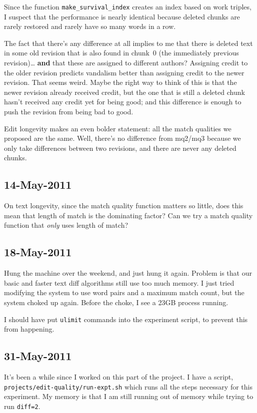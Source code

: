 Since the function \texttt{make\_survival\_index} creates
an index based on work triples, I suspect that the performance
is nearly identical because deleted chunks are rarely restored
and rarely have so many words in a row.

The fact that there's any difference at all implies to me
that there is deleted text in some old revision that is
also found in chunk~0 (the immediately previous revision)\ldots
\textbf{and} that these are assigned to different authors?
Assigning credit to the older revision predicts vandalism
better than assigning credit to the newer revision.
That seems weird.
Maybe the right way to think of this is that the newer revision
already received credit, but the one that is still a deleted
chunk hasn't received any credit yet for being good;
and this difference is enough to push the revision from
being bad to good.

Edit longevity makes an even bolder statement: all the
match qualities we proposed are the same.
Well, there's no difference from mq2/mq3 because we only
take differences between two revisions, and there are never
any deleted chunks.

\subsection{14-May-2011}

On text longevity, since the match quality function matters so little,
does this mean that length of match is the dominating factor?
Can we try a match quality function that \textit{only} uses
length of match?

\subsection{18-May-2011}

Hung the machine over the weekend, and just hung it again.
Problem is that our basic and faster text diff algorithms
still use too much memory.
I just tried modifying the system to use word pairs and
a maximum match count, but the system choked up again.
Before the choke, I see a 23GB process running.

I should have put \texttt{ulimit} commands into the
experiment script, to prevent this from happening.

\subsection{31-May-2011}

It's been a while since I worked on this part of the project.
I have a script,
\texttt{projects/edit-quality/run-expt.sh} which runs all
the steps necessary for this experiment.
My memory is that I am still running out of memory while
trying to run \texttt{diff=2}.

